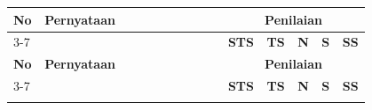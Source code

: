 \begin{longtable}{|p{0.05\linewidth}|p{0.5\linewidth}|p{0.05\linewidth}|p{0.05\linewidth}|p{0.05\linewidth}|p{0.05\linewidth}|p{0.05\linewidth}|}
      \hline
      \textbf{No} & \textbf{Pernyataan}                                                                                   & \multicolumn{5}{c|}{\textbf{Penilaian}}                                                       \\
      \cline{3-7}
                  &                                                                                                       & \textbf{STS}                            & \textbf{TS} & \textbf{N} & \textbf{S} & \textbf{SS} \\
      \hline
      \endfirsthead

      \hline
      \textbf{No} & \textbf{Pernyataan}                                                                                   & \multicolumn{5}{c|}{\textbf{Penilaian}}                                                       \\
      \cline{3-7}
                  &                                                                                                       & \textbf{STS}                            & \textbf{TS} & \textbf{N} & \textbf{S} & \textbf{SS} \\
      \hline
      \endhead

      \hline
      \endfoot

      \hline
      \endlastfoot


\end{longtable}
